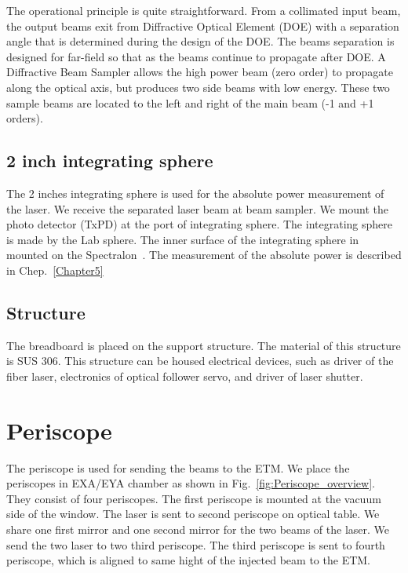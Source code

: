 The operational principle is quite straightforward. From a collimated input beam, the output beams exit from Diffractive Optical Element (DOE) with a separation angle that is determined during the design of the DOE. The beams separation is designed for far-field so that as the beams continue to propagate after DOE.
A Diffractive Beam Sampler allows the high power beam (zero order) to propagate along the optical axis, but produces two side beams with low energy. These two sample beams are located to the left and right of the main beam (-1 and +1 orders).

\subsection{2 inch integrating sphere}
The 2 inches integrating sphere is used for the absolute power measurement of the laser. We receive the separated laser beam at beam sampler. We mount the photo detector (TxPD) at the port of integrating sphere. The integrating sphere is made by the Lab sphere. The inner surface of the integrating sphere in mounted on the Spectralon~\cite{Spectralon}. The measurement of the absolute power is described in Chep.~\ref{Chapter5}

\subsection{Structure}
The breadboard is placed on the support structure. The material of this structure is SUS 306. This structure can be housed electrical devices, such as driver of the fiber laser, electronics of optical follower servo, and driver of laser shutter. 

\section{Periscope}
The periscope is used for sending the beams to the ETM. We place the periscopes in EXA/EYA chamber as shown in Fig.~\ref{fig:Periscope_overview}.
They consist of four periscopes. The first periscope is mounted at the vacuum side of the window. The laser is sent to second periscope on optical table. We share one first mirror and one second mirror for the two beams of the laser. We send the two laser to two third periscope. The third periscope is sent to fourth periscope, which is aligned to same hight of the injected beam to the ETM. 

